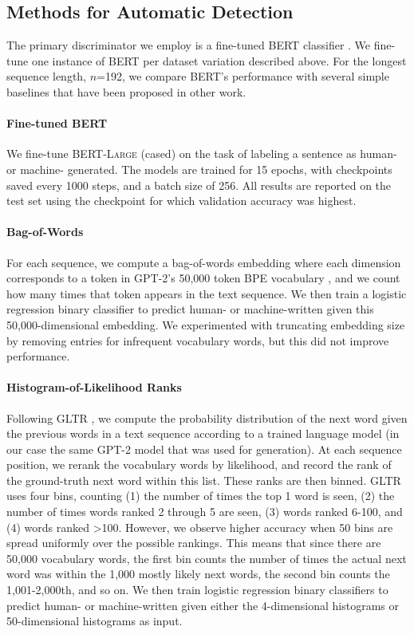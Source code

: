 \subsection{Methods for Automatic Detection}
The primary discriminator we employ is a fine-tuned BERT classifier \citep{devlin2018bert}.
We fine-tune one instance of BERT per dataset variation described above.
For the longest sequence length, $n$=192, we compare BERT's performance with several simple baselines that have been proposed in other work.

\paragraph{Fine-tuned BERT}
We fine-tune BERT-\textsc{Large} (cased) on the task of labeling a sentence as human- or machine- generated.
The models are trained for 15 epochs, with checkpoints saved every 1000 steps, and a batch size of 256.
All results are reported on the test set using the checkpoint for which validation accuracy was highest.

\paragraph{Bag-of-Words}
For each sequence, we compute a bag-of-words embedding where each dimension corresponds to a token in GPT-2's  50,000 token BPE vocabulary \citep{sennrich2016neural}, and we count how many times that token appears in the text sequence. 
We then train a logistic regression binary classifier to predict human- or machine-written given this 50,000-dimensional embedding.
We experimented with truncating embedding size by removing entries for infrequent vocabulary words, but this did not improve performance.

\paragraph{Histogram-of-Likelihood Ranks}
Following GLTR \citep{gehrmann2019gltr}, we compute the probability distribution of the next word given the previous words in a text sequence according to a trained language model (in our case the same GPT-2 model that was used for generation).
At each sequence position, we rerank the vocabulary words by likelihood, and record the rank of the ground-truth next word within this list.
These ranks are then binned.
GLTR uses four bins, counting (1) the number of times the top 1 word is seen, (2) the number of times words ranked 2 through 5 are seen, (3) words ranked 6-100, and (4) words ranked \textgreater100.
However, we observe higher accuracy when 50 bins are spread uniformly over the possible rankings.
This means that since there are 50,000 vocabulary words, the first bin counts the number of times the actual next word was within the 1,000 mostly likely next words, the second bin counts the 1,001-2,000th, and so on.
We then train logistic regression binary classifiers to predict human- or machine-written given either the 4-dimensional histograms or 50-dimensional histograms as input.


